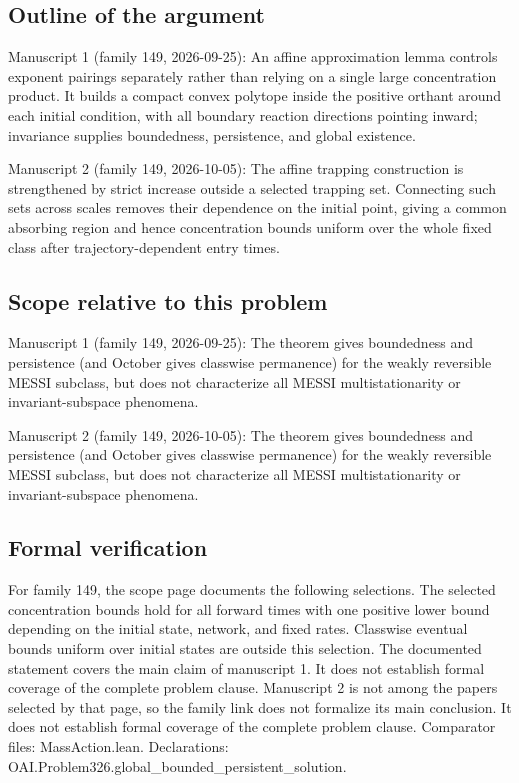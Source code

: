 \documentclass[11pt]{article}
\begin{document}
\subsection{Outline of the argument}
Manuscript 1 (family 149, 2026-09-25): An affine approximation lemma controls exponent pairings separately rather than relying on a single large concentration product. It builds a compact convex polytope inside the positive orthant around each initial condition, with all boundary reaction directions pointing inward; invariance supplies boundedness, persistence, and global existence.

Manuscript 2 (family 149, 2026-10-05): The affine trapping construction is strengthened by strict increase outside a selected trapping set. Connecting such sets across scales removes their dependence on the initial point, giving a common absorbing region and hence concentration bounds uniform over the whole fixed class after trajectory-dependent entry times.

\subsection{Scope relative to this problem}
Manuscript 1 (family 149, 2026-09-25): The theorem gives boundedness and persistence (and October gives classwise permanence) for the weakly reversible MESSI subclass, but does not characterize all MESSI multistationarity or invariant-subspace phenomena.

Manuscript 2 (family 149, 2026-10-05): The theorem gives boundedness and persistence (and October gives classwise permanence) for the weakly reversible MESSI subclass, but does not characterize all MESSI multistationarity or invariant-subspace phenomena.

\subsection{Formal verification}
For family 149, the scope page documents the following selections. The selected concentration bounds hold for all forward times with one positive lower bound depending on the initial state, network, and fixed rates. Classwise eventual bounds uniform over initial states are outside this selection. The documented statement covers the main claim of manuscript 1. It does not establish formal coverage of the complete problem clause. Manuscript 2 is not among the papers selected by that page, so the family link does not formalize its main conclusion. It does not establish formal coverage of the complete problem clause. Comparator files: MassAction.lean. Declarations: OAI.Problem326.global\_bounded\_persistent\_solution.
\end{document}
